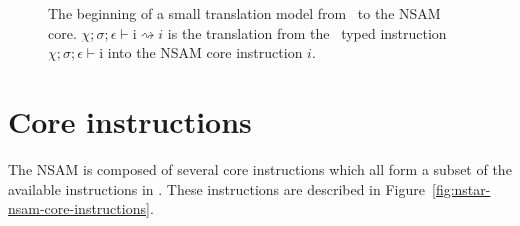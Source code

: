 \begin{figure}[htb]
	\centering


	\caption{The beginning of a small translation model from \nstar\ to the NSAM core. \textbf{$\chi;\sigma;\epsilon\vdash\text{i} \rightsquigarrow \textit{i}$} is the translation from the \nstar\ typed instruction \textbf{$\chi;\sigma;\epsilon\vdash\text{i}$} into the NSAM core instruction \textbf{$\textit{i}$}.}
	\label{fig:nstar-nsam-translation-nstar-nsam}
\end{figure}

\section{Core instructions}\label{sec:nstar-nsam-core}

The NSAM is composed of several core instructions which all form a subset of the available instructions in \nstar.
These instructions are described in Figure~\ref{fig:nstar-nsam-core-instructions}.

